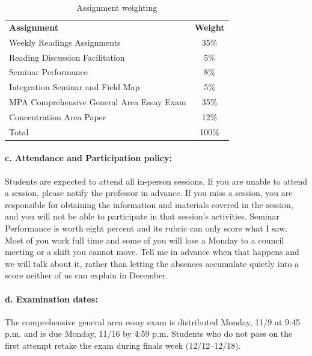 \documentclass[11pt]{article}     %
\begin{document}
\begin{center}
\begin{table}[h]
  \caption{Assignment weighting}
  \label{tab:grade-weights}
  \centering
  \begin{tabular}{l c}
    \rowcolor{gray!20}
    \textbf{Assignment} & \textbf{Weight} \\
    Weekly Readings Assignments & 35\% \\
    Reading Discussion Facilitation & 5\% \\
    Seminar Performance & 8\% \\
    Integration Seminar and Field Map & 5\% \\
    MPA Comprehensive General Area Essay Exam & 35\% \\
    Concentration Area Paper & 12\% \\
  Total            & 100\%      \\
  \end{tabular}
\end{table}
\end{center}

\vspace{1em}
\paragraph*{c. Attendance and Participation policy:}
Students are expected to attend all in-person sessions. If you are unable to attend a session, please notify the professor in advance. If you miss a session, you are responsible for obtaining the information and materials covered in the session, and you will not be able to participate in that session's activities. Seminar Performance is worth eight percent and its rubric can only score what I saw. Most of you work full time and some of you will lose a Monday to a council meeting or a shift you cannot move. Tell me in advance when that happens and we will talk about it, rather than letting the absences accumulate quietly into a score neither of us can explain in December.

\vspace{1em}
\paragraph*{d. Examination dates:}
The comprehensive general area essay exam is distributed Monday, 11/9 at 9:45 p.m. and is due Monday, 11/16 by 4:59 p.m. Students who do not pass on the first attempt retake the exam during finals week (12/12--12/18).
\end{document}
